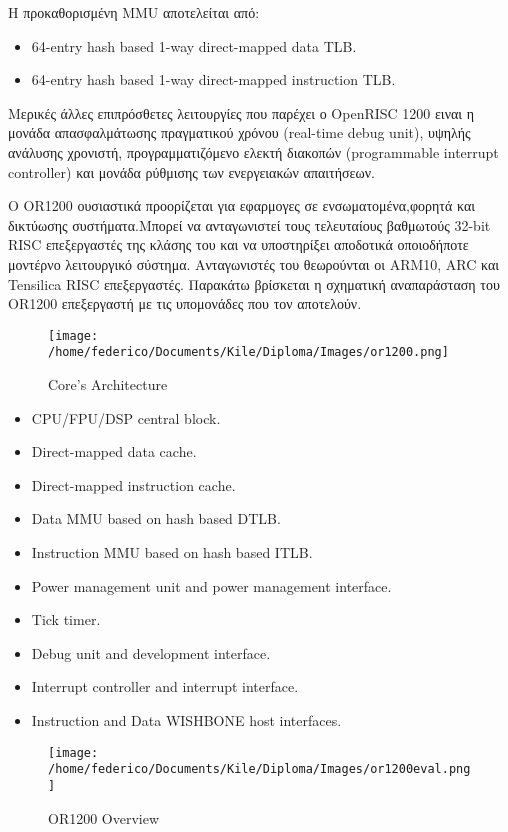 \documentclass[a4paper,10pt]{article}
\begin{document}
{{Η προκαθορισμένη MMU αποτελείται από:
\begin{itemize}
 \item 64-entry hash based 1-way direct-mapped data TLB.
 \item 64-entry hash based 1-way direct-mapped instruction TLB.
\end{itemize}

Μερικές άλλες επιπρόσθετες λειτουργίες που παρέχει ο OpenRISC 1200 ειναι η μονάδα
απασφαλμάτωσης πραγματικού χρόνου (real-time debug unit), υψηλής ανάλυσης χρονιστή,
προγραμματιζόμενο ελεκτή διακοπών (programmable interrupt controller) και μονάδα
ρύθμισης των ενεργειακών απαιτήσεων.


Ο OR1200 ουσιαστικά προορίζεται για εφαρμογες σε ενσωματομένα,φορητά και δικτύωσης
συστήματα.Μπορεί να ανταγωνιστεί τους τελευταίους βαθμωτούς 32-bit RISC επεξεργαστές
της κλάσης του και να υποστηρίξει αποδοτικά οποιοδήποτε μοντέρνο λειτουργικό σύστημα.
Ανταγωνιστές του θεωρούνται οι ARM10, ARC και Tensilica RISC επεξεργαστές.
\newline \newline
Παρακάτω βρίσκεται η σχηματική αναπαράσταση του OR1200 επεξεργαστή με τις υπομονάδες
που τον αποτελούν.

\begin{figure}[h!]
 \centering
 \texttt{[image: /home/federico/Documents/Kile/Diploma/Images/or1200.png]}
 \caption{Core's Architecture}
\end{figure}

\begin{itemize}
 \item CPU/FPU/DSP central block.
 \item Direct-mapped data cache.
 \item Direct-mapped instruction cache.
 \item Data MMU based on hash based DTLB.
 \item Instruction MMU based on hash based ITLB.
 \item Power management unit and power management interface.
 \item Tick timer.
 \item Debug unit and development interface.
 \item Interrupt controller and interrupt interface.
 \item Instruction and Data WISHBONE host interfaces.
\end{itemize}
\begin{figure}[h!]
 \centering
 \texttt{[image: /home/federico/Documents/Kile/Diploma/Images/or1200eval.png]}
 \caption{OR1200 Overview}
\end{figure}

}}
\end{document}
